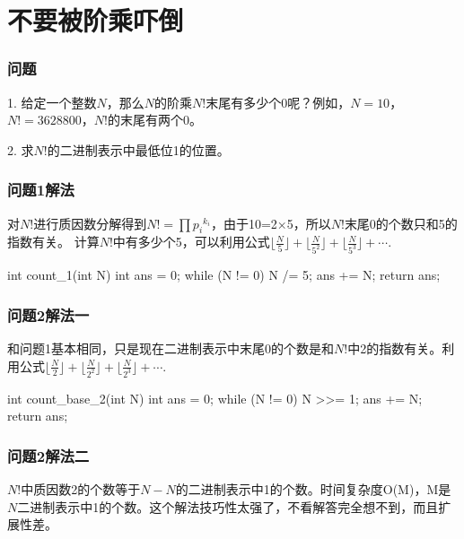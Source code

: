 \section{不要被阶乘吓倒} %
\label{sec:factorial-zeros}

\subsubsection{问题}
1. 给定一个整数$N$，那么$N$的阶乘$N!$末尾有多少个0呢？例如，$N=10$，$N!=3628800$，$N!$的末尾有两个0。

2. 求$N!$的二进制表示中最低位1的位置。

\subsubsection{问题1解法}
对$N!$进行质因数分解得到$N!=\prod {p_i}^{k_i}$，由于10=2×5，所以$N!$末尾0的个数只和5的指数有关。
计算$N!$中有多少个5，可以利用公式$\lfloor\frac{N}{5}\rfloor+\lfloor\frac{N}{5^2}\rfloor+\lfloor\frac{N}{5^3}\rfloor+\cdots$.
\begin{Codex}[label={[$O(log5(N))+O(1)$]Chap02_02_Factorial.java}]
int count_1(int N) {
    int ans = 0;
	while (N != 0) {
        N /= 5;
        ans += N;
    }
    return ans;
}
\end{Codex}

\subsubsection{问题2解法一}
和问题1基本相同，只是现在二进制表示中末尾0的个数是和$N!$中2的指数有关。利用公式$\lfloor\frac{N}{2}\rfloor+\lfloor\frac{N}{2^2}\rfloor+\lfloor\frac{N}{2^3}\rfloor+\cdots$.
\begin{Codex}[label={[$O(lg(N))+O(1)$]Chap02_02_Factorial.java}]
int count_base_2(int N) {
    int ans = 0;
    while (N != 0) {
        N >>= 1;
        ans += N;
    }
    return ans;
}
\end{Codex}

\subsubsection{问题2解法二}
$N!$中质因数2的个数等于$N-N$的二进制表示中1的个数。时间复杂度O(M)，M是$N$二进制表示中1的个数。这个解法技巧性太强了，不看解答完全想不到，而且扩展性差。

